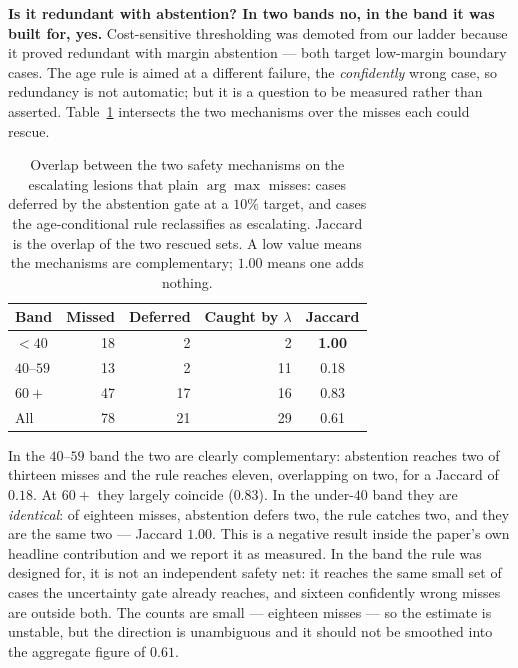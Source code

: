 \documentclass[journal]{IEEEtran}
\begin{document}
\textbf{Is it redundant with abstention? In two bands no, in the band it was built for, yes.}
Cost-sensitive thresholding was demoted from our ladder because it proved redundant with
margin abstention --- both target low-margin boundary cases. The age rule is aimed at a
different failure, the \emph{confidently} wrong case, so redundancy is not automatic; but it
is a question to be measured rather than asserted. Table~\ref{tab:ortho} intersects the two
mechanisms over the misses each could rescue.

\begin{table}[t]
\centering
\caption{Overlap between the two safety mechanisms on the escalating lesions that plain
$\arg\max$ misses: cases deferred by the abstention gate at a $10\%$ target, and cases the
age-conditional rule reclassifies as escalating. Jaccard is the overlap of the two rescued
sets. A low value means the mechanisms are complementary; $1.00$ means one adds nothing.}
\label{tab:ortho}
\begin{tabular}{lrrrc}
\toprule
Band & Missed & Deferred & Caught by $\lambda$ & Jaccard \\
\midrule
$<40$      & 18 & 2  & 2  & \textbf{1.00} \\
$40$--$59$ & 13 & 2  & 11 & 0.18 \\
$60+$      & 47 & 17 & 16 & 0.83 \\
\midrule
All        & 78 & 21 & 29 & 0.61 \\
\bottomrule
\end{tabular}
\end{table}

In the $40$--$59$ band the two are clearly complementary: abstention reaches two of thirteen
misses and the rule reaches eleven, overlapping on two, for a Jaccard of $0.18$. At $60+$ they
largely coincide ($0.83$). In the under-$40$ band they are \emph{identical}: of eighteen
misses, abstention defers two, the rule catches two, and they are the same two --- Jaccard
$1.00$. This is a negative result inside the paper's own headline contribution and we report
it as measured. In the band the rule was designed for, it is not an independent safety net: it
reaches the same small set of cases the uncertainty gate already reaches, and sixteen
confidently wrong misses are outside both. The counts are small --- eighteen misses --- so the
estimate is unstable, but the direction is unambiguous and it should not be smoothed into the
aggregate figure of $0.61$.
\end{document}
